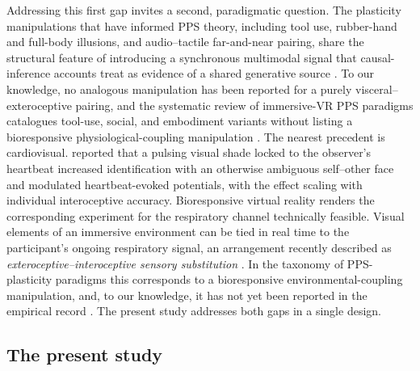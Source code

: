 Addressing this first gap invites a second, paradigmatic question. The plasticity manipulations that have informed PPS theory, including tool use, rubber-hand and full-body illusions, and audio--tactile far-and-near pairing, share the structural feature of introducing a synchronous multimodal signal that causal-inference accounts treat as evidence of a shared generative source \citep{samad_2015, chancel_2021, costantini_2016, parise_2016}. To our knowledge, no analogous manipulation has been reported for a purely visceral--exteroceptive pairing, and the systematic review of immersive-VR PPS paradigms catalogues tool-use, social, and embodiment variants without listing a bioresponsive physiological-coupling manipulation \citep{karakoc_2025}. The nearest precedent is cardiovisual. \citet{sel_2016} reported that a pulsing visual shade locked to the observer's heartbeat increased identification with an otherwise ambiguous self--other face and modulated heartbeat-evoked potentials, with the effect scaling with individual interoceptive accuracy. Bioresponsive virtual reality renders the corresponding experiment for the respiratory channel technically feasible. Visual elements of an immersive environment can be tied in real time to the participant's ongoing respiratory signal, an arrangement recently described as \emph{exteroceptive--interoceptive sensory substitution} \citep{Goral2024}. In the taxonomy of PPS-plasticity paradigms this corresponds to a bioresponsive environmental-coupling manipulation, and, to our knowledge, it has not yet been reported in the empirical record \citep{karakoc_2025, serino2017peripersonal, belli2021breathink, Belli2024}. The present study addresses both gaps in a single design.

\subsection{The present study}



